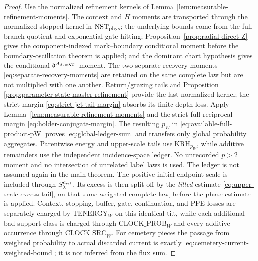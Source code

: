 \documentclass[11pt]{article}
\begin{document}
\begin{proof}
Use the normalized refinement kernels of
Lemma~\ref{lem:measurable-refinement-moments}.  The context and $H$ moments
are transported through the normalized stopped kernel in
$\mathrm{NST}_{\rm phys}$; the underlying bounds come from the full-branch
quotient and exponential gate hitting;
Proposition~\ref{prop:radial-direct-Z} gives the component-indexed
mark--boundary conditional moment before the boundary-oscillation theorem is
applied; and the dominant chart hypothesis gives the conditional
$\mathfrak d^{A_{\rm dom}q_D}$ moment.  The two separate recovery moments
\eqref{eq:separate-recovery-moments} are retained on the same complete law
but are not multiplied with one another.  Return/grazing tails and Proposition
\ref{prop:parameter-state-master-refinement} provide the last normalized
kernel; the strict margin \eqref{eq:strict-jet-tail-margin} absorbs its
finite-depth loss.  Apply Lemma~\ref{lem:measurable-refinement-moments} and
the strict full reciprocal margin \eqref{eq:holder-conjugate-margin}.  The
resulting $p_W$ in \eqref{eq:available-full-product-pW} proves
\eqref{eq:global-ledger-sum} and transfers only global probability
aggregates.  Parentwise energy and upper-scale tails use
$\mathrm{KRH}_{p_W}$, while additive remainders use the independent
incidence-space ledger.  No unrecorded $p>2$ moment and no intersection of
unrelated label laws is used.  The ledger is not assumed again in the main
theorem.
The positive initial endpoint scale is included through
$S_\lambda^{a_{\rm scl}}$.  Its excess is then split off by the
\emph{tilted} estimate \eqref{eq:upper-scale-excess-tail}, on that same
weighted complete law, before the phase estimate is applied.  Context,
stopping, buffer, gate, continuation, and PPE losses are separately charged
by $\mathrm{TENERGY}_{W}$ on this identical tilt, while each additional
bad-support class is charged through $\mathrm{CLOCK\_PROB}_{W}$ and every
additive occurrence through $\mathrm{CLOCK\_SRC}_{W}$.  For cemetery pieces the
passage from weighted probability to actual discarded current is exactly
\eqref{eq:cemetery-current-weighted-bound}; it is not inferred from the
flux sum.
\end{proof}
\end{document}
